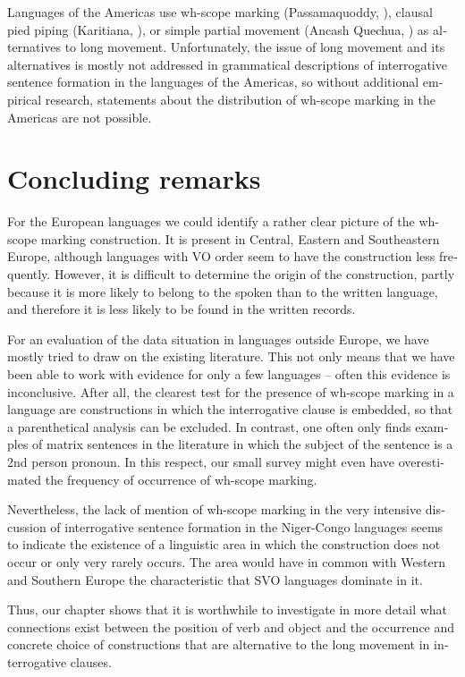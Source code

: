 \documentclass[output=paper,colorlinks,citecolor=brown]{langscibook}
\begin{document}
\begin{otherlanguage}{english}
Languages of the Americas use wh-scope marking (Passamaquoddy, \citealt{Bruening2006}), clausal pied piping (Karitiana, \citealt{Vivanco2019}), or simple partial movement (Ancash Quechua, \citealt[487]{Muller-Sternefeld1996}) as alternatives to long movement. Unfortunately, the issue of long movement and its alternatives is mostly not addressed in grammatical descriptions of interrogative sentence formation in the languages of the Americas, so without additional empirical research, statements about the distribution of wh-scope marking in the Americas are not possible.

\section{Concluding remarks} \label{concluding:remarks}

For the European languages we could identify a rather clear picture of the wh-scope marking construction. It is present in Central, Eastern and Southeastern Europe, although languages with VO order seem to have the construction less frequently. However, it is difficult to determine the origin of the construction, partly because it is more likely to belong to the spoken than to the written language, and therefore it is less likely to be found in the written records.

For an evaluation of the data situation in languages outside Europe, we have mostly tried to draw on the existing literature. This not only means that we have been able to work with evidence for only a few languages -- often this evidence is inconclusive. After all, the clearest test for the presence of wh-scope marking in a language are constructions in which the interrogative clause is embedded, so that a parenthetical analysis can be excluded. In contrast, one often only finds examples of matrix sentences in the literature in which the subject of the sentence is a 2nd person pronoun. In this respect, our small survey might even have overestimated the frequency of occurrence of wh-scope marking.

Nevertheless, the lack of mention of wh-scope marking in the very intensive discussion of interrogative sentence formation in the Niger-Congo languages seems to indicate the existence of a linguistic area in which the construction does not occur or only very rarely occurs. The area would have in common with Western and Southern Europe the characteristic that SVO languages dominate in it.

Thus, our chapter shows that it is worthwhile to investigate in more detail what connections exist between the position of verb and object and the occurrence and concrete choice of constructions that are alternative to the long movement in interrogative clauses.


\end{otherlanguage}
\end{document}
